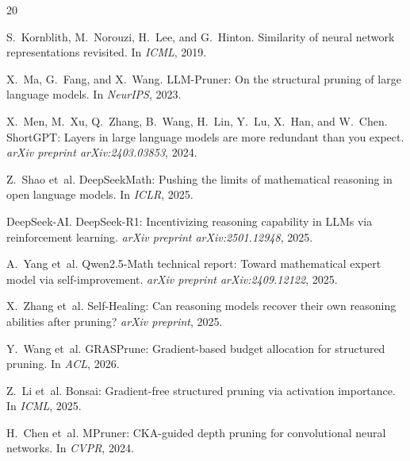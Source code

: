\documentclass[11pt]{article}
\begin{document}
\begin{thebibliography}{20}

S.~Kornblith, M.~Norouzi, H.~Lee, and G.~Hinton.
\newblock Similarity of neural network representations revisited.
\newblock In \emph{ICML}, 2019.

X.~Ma, G.~Fang, and X.~Wang.
\newblock LLM-Pruner: On the structural pruning of large language models.
\newblock In \emph{NeurIPS}, 2023.

X.~Men, M.~Xu, Q.~Zhang, B.~Wang, H.~Lin, Y.~Lu, X.~Han, and W.~Chen.
\newblock ShortGPT: Layers in large language models are more redundant than you expect.
\newblock \emph{arXiv preprint arXiv:2403.03853}, 2024.

Z.~Shao et~al.
\newblock DeepSeekMath: Pushing the limits of mathematical reasoning in open language models.
\newblock In \emph{ICLR}, 2025.

DeepSeek-AI.
\newblock DeepSeek-R1: Incentivizing reasoning capability in LLMs via reinforcement learning.
\newblock \emph{arXiv preprint arXiv:2501.12948}, 2025.

A.~Yang et~al.
\newblock Qwen2.5-Math technical report: Toward mathematical expert model via self-improvement.
\newblock \emph{arXiv preprint arXiv:2409.12122}, 2025.

X.~Zhang et~al.
\newblock Self-Healing: Can reasoning models recover their own reasoning abilities after pruning?
\newblock \emph{arXiv preprint}, 2025.

Y.~Wang et~al.
\newblock GRASPrune: Gradient-based budget allocation for structured pruning.
\newblock In \emph{ACL}, 2026.

Z.~Li et~al.
\newblock Bonsai: Gradient-free structured pruning via activation importance.
\newblock In \emph{ICML}, 2025.

H.~Chen et~al.
\newblock MPruner: CKA-guided depth pruning for convolutional neural networks.
\newblock In \emph{CVPR}, 2024.

\end{thebibliography}
\end{document}
